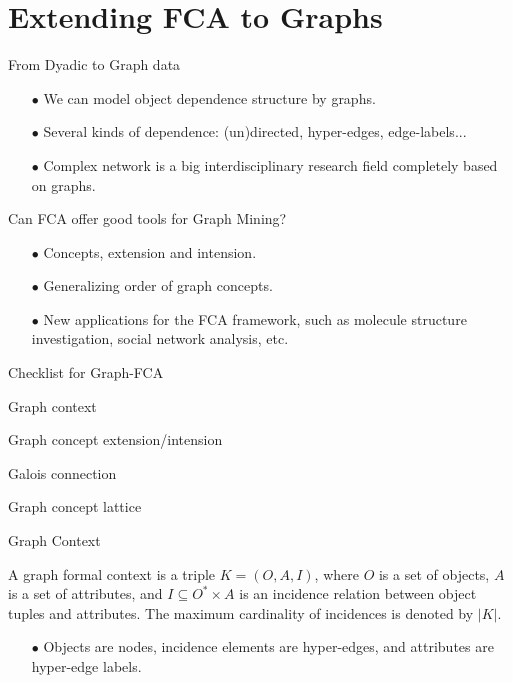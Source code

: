 \documentclass[pdf,xcolor=table]{beamer}
\begin{document}
\section[Graph-FCA]{Extending FCA to Graphs}
\begin{frame}[t]{From Dyadic to Graph data}
    \begin{itemize}
        \item[$\bullet$] We can model object dependence structure by graphs.
        \item[$\bullet$] Several kinds of dependence: (un)directed, hyper-edges, edge-labels...
        \item[$\bullet$] Complex network is a big interdisciplinary research field completely based on graphs.
    \end{itemize}
\end{frame}
\begin{frame}[t]{Can FCA offer good tools for Graph Mining?}
    \begin{itemize}
        \item[$\bullet$] Concepts, extension and intension.
        \item[$\bullet$] Generalizing order of graph concepts.
        \item[$\bullet$] New applications for the FCA framework, such as molecule structure investigation, social network analysis, etc.
    \end{itemize}
\end{frame}

\begin{frame}[t]{Checklist for Graph-FCA}
    \begin{todolist}
        \item Graph context
        \item Graph concept extension/intension
        \item Galois connection
        \item Graph concept lattice                
    \end{todolist}
\end{frame}

\begin{frame}[t]{Graph Context}
    \begin{definition}
        A graph formal context is a triple $K = (O, A, I)$, where $O$ is a set of objects, $A$ is a set of attributes, and $I \subseteq O^* \times A$ is an incidence relation between object tuples and attributes.
        The maximum cardinality of incidences is denoted by $|K|$.
    \end{definition}
    \begin{itemize}
        \item[$\bullet$] Objects are nodes, incidence elements are hyper-edges, and attributes are hyper-edge labels.
    \end{itemize}
\end{frame}
\end{document}

